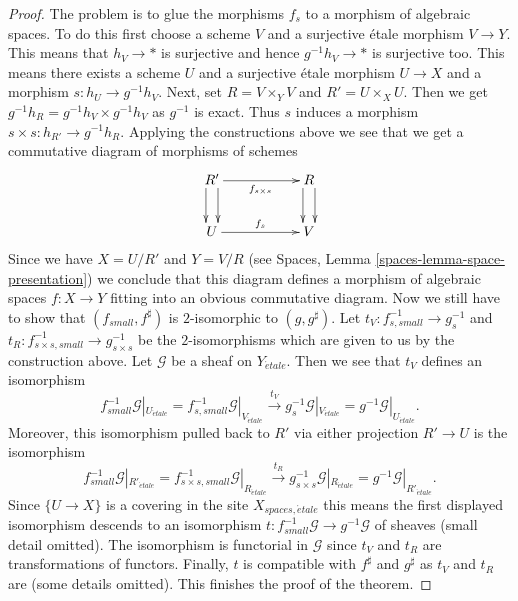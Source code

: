 \documentclass[10pt,a4paper]{amsart}
\theoremstyle{plain}
\theoremstyle{definition}
\theoremstyle{remark}
\numberwithin{equation}{subsection}
\def\etale{{\acute{e}tale}}
\begin{document}
\begin{proof}
\medskip\noindent
The problem is to glue the morphisms $f_s$ to a morphism of algebraic
spaces. To do this first choose a scheme $V$ and a surjective \'etale
morphism $V \to Y$. This means that $h_V \to *$ is surjective and hence
$g^{-1}h_V \to *$ is surjective too. This means there exists a scheme $U$
and a surjective \'etale morphism $U \to X$ and a morphism
$s : h_U \to g^{-1}h_V$. Next, set $R = V \times_Y V$ and
$R' = U \times_X U$. Then we get
$g^{-1}h_R = g^{-1}h_V \times g^{-1}h_V$ as $g^{-1}$ is exact.
Thus $s$ induces a morphism $s \times s : h_{R'} \to g^{-1}h_R$.
Applying the constructions above we see that we get a
commutative diagram of morphisms of schemes
$$
\xymatrix{
R' \ar@<1ex>[d] \ar@<-1ex>[d] \ar[rr]_{f_{s \times s}} & &
R \ar@<1ex>[d] \ar@<-1ex>[d] \\
U \ar[rr]^{f_s} & &
V
}
$$
Since we have $X = U/R'$ and $Y = V/R$ (see
Spaces, Lemma \ref{spaces-lemma-space-presentation})
we conclude that this diagram
defines a morphism of algebraic spaces $f : X \to Y$ fitting
into an obvious commutative diagram.
Now we still have to show that $(f_{small}, f^\sharp)$ is
$2$-isomorphic to $(g, g^\sharp)$.
Let $t_V : f_{s, small}^{-1} \to g_s^{-1}$ and
$t_R : f_{s \times s, small}^{-1} \to g_{s \times s}^{-1}$ be
the $2$-isomorphisms which are given to us by the construction above.
Let $\mathcal{G}$ be a sheaf on $Y_\etale$. Then we see that
$t_V$ defines an isomorphism
$$
f_{small}^{-1}\mathcal{G}|_{U_\etale}
=
f_{s, small}^{-1}\mathcal{G}|_{V_\etale}
\xrightarrow{t_V}
g_s^{-1}\mathcal{G}|_{V_\etale}
=
g^{-1}\mathcal{G}|_{U_\etale}.
$$
Moreover, this isomorphism pulled back to $R'$ via either projection
$R' \to U$ is the isomorphism
$$
f_{small}^{-1}\mathcal{G}|_{R'_\etale}
=
f_{s \times s, small}^{-1}\mathcal{G}|_{R_\etale}
\xrightarrow{t_R}
g_{s \times s}^{-1}\mathcal{G}|_{R_\etale}
=
g^{-1}\mathcal{G}|_{R'_\etale}.
$$
Since $\{U \to X\}$ is a covering in the site $X_{spaces, \etale}$
this means the first displayed isomorphism descends to an isomorphism
$t : f_{small}^{-1}\mathcal{G} \to g^{-1}\mathcal{G}$
of sheaves (small detail omitted). The isomorphism is functorial
in $\mathcal{G}$ since $t_V$ and $t_R$ are transformations of functors.
Finally, $t$ is compatible with $f^\sharp$ and $g^\sharp$ as
$t_V$ and $t_R$ are (some details omitted).
This finishes the proof of the theorem.
\end{proof}
\end{document}
